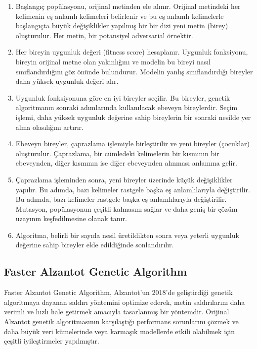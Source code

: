 \begin{enumerate}
    \item Başlangıç popülasyonu, orijinal metinden ele alınır. Orijinal metindeki her kelimenin eş anlamlı kelimeleri belirlenir ve bu eş anlamlı kelimelerle başlangıçta büyük değişiklikler yapılmış bir bir dizi yeni metin (birey) oluşturulur. Her metin, bir potansiyel adversarial örnektir.
    \item Her bireyin uygunluk değeri (fitness score) hesaplanır. Uygunluk fonksiyonu, bireyin orijinal metne olan yakınlığını ve modelin bu bireyi nasıl sınıflandırdığını göz önünde bulundurur. Modelin yanlış sınıflandırdığı bireyler daha yüksek uygunluk değeri alır.
    \item Uygunluk fonksiyonuna göre en iyi bireyler seçilir. Bu bireyler, genetik algoritmanın sonraki adımlarında kullanılacak ebeveyn bireylerdir. Seçim işlemi, daha yüksek uygunluk değerine sahip bireylerin bir sonraki nesilde yer alma olasılığını artırır.
    \item Ebeveyn bireyler, çaprazlama işlemiyle birleştirilir ve yeni bireyler (çocuklar) oluşturulur. Çaprazlama, bir cümledeki kelimelerin bir kısmının bir ebeveynden, diğer kısmının ise diğer ebeveynden alınması anlamına gelir.
    \item Çaprazlama işleminden sonra, yeni bireyler üzerinde küçük değişiklikler yapılır. Bu adımda, bazı kelimeler rastgele başka eş anlamlılarıyla değiştirilir. Bu adımda, bazı kelimeler rastgele başka eş anlamlılarıyla değiştirilir. Mutasyon, popülasyonun çeşitli kalmasını sağlar ve daha geniş bir çözüm uzayının keşfedilmesine olanak tanır.
    \item Algoritma, belirli bir sayıda nesil üretildikten sonra veya yeterli uygunluk değerine sahip bireyler elde edildiğinde sonlandırılır.
\end{enumerate}

\newpage

\subsection{Faster Alzantot Genetic Algorithm}

Faster Alzantot Genetic Algorithm, Alzantot'un 2018’de geliştirdiği genetik algoritmaya dayanan saldırı yöntemini optimize ederek, metin saldırılarını daha verimli ve hızlı hale getirmek amacıyla tasarlanmış bir yöntemdir. Orijinal Alzantot genetik algoritmasının karşılaştığı performans sorunlarını çözmek ve daha büyük veri kümelerinde veya karmaşık modellerde etkili olabilmek için çeşitli iyileştirmeler yapılmıştır.

